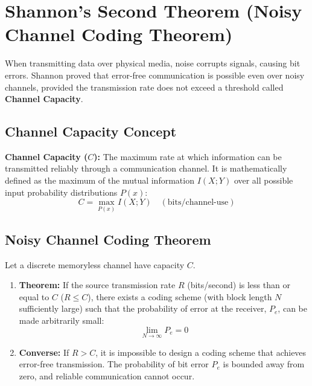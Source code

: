 \documentclass[12pt,a4paper]{article}
\begin{document}
\section{Shannon's Second Theorem (Noisy Channel Coding Theorem)}

When transmitting data over physical media, noise corrupts signals, causing bit errors. Shannon proved that error-free communication is possible even over noisy channels, provided the transmission rate does not exceed a threshold called \textbf{Channel Capacity}.

\subsection{Channel Capacity Concept}
\begin{tcolorbox}[defbox]
\textbf{Channel Capacity ($C$):} The maximum rate at which information can be transmitted reliably through a communication channel. It is mathematically defined as the maximum of the mutual information $I(X; Y)$ over all possible input probability distributions $P(x)$:
\begin{equation}
  C = \max_{P(x)} I(X; Y) \quad (\text{bits/channel-use})
\end{equation}
\end{tcolorbox}

\subsection{Noisy Channel Coding Theorem}
\begin{tcolorbox}[exambox, title={\textbf{Shannon's Second Theorem (Noisy Channel Coding Theorem)}}]
Let a discrete memoryless channel have capacity $C$.
\begin{enumerate}[label=\textbf{\arabic*.}, leftmargin=1.5em, itemsep=3pt, topsep=1pt]
  \item \textbf{Theorem:} If the source transmission rate $R$ (bits/second) is less than or equal to $C$ ($R \le C$), there exists a coding scheme (with block length $N$ sufficiently large) such that the probability of error at the receiver, $P_e$, can be made arbitrarily small:
    \begin{equation}
      \lim_{N \to \infty} P_e = 0
    \end{equation}
  \item \textbf{Converse:} If $R > C$, it is impossible to design a coding scheme that achieves error-free transmission. The probability of bit error $P_e$ is bounded away from zero, and reliable communication cannot occur.
\end{enumerate}
\end{tcolorbox}
\end{document}
